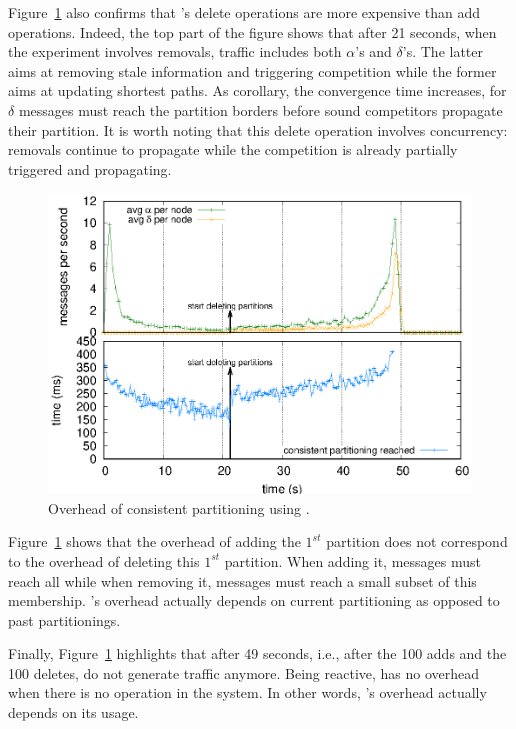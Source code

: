 \begin{asparadesc}
\noindent Figure~\ref{fig:complexity} also confirms that \NAME's
delete operations are more expensive than add operations. Indeed, the
top part of the figure shows that after 21 seconds, when the
experiment involves removals, traffic includes both $\alpha$'s and
$\delta$'s. The latter aims at removing stale information and
triggering competition while the former aims at updating shortest
paths. As corollary, the convergence time increases, for $\delta$
messages must reach the partition borders before sound competitors
propagate their partition. It is worth noting that this delete
operation involves concurrency: removals continue to propagate while
the competition is already partially triggered and propagating.

\begin{figure}
  \centering\includegraphics[width=0.8\columnwidth]{img/as_cast_complexity.eps}
  \caption{\label{fig:complexity}Overhead of consistent partitioning
    using \NAME.}
\end{figure}

\noindent Figure~\ref{fig:complexity} shows that the overhead of
adding the $1^{st}$ partition does not correspond to the overhead of
deleting this $1^{st}$ partition. When adding it, messages must reach
all \processes while when removing it, messages must reach a small
subset of this membership.  \NAME's overhead actually depends on
current partitioning as opposed to past partitionings.

\noindent Finally, Figure~\ref{fig:complexity} highlights that after
49 seconds, i.e., after the 100 adds and the 100 deletes, \processes
do not generate traffic anymore. Being reactive, \NAME has no overhead
when there is no operation in the system. In other words, \NAME's
overhead actually depends on its usage.

\end{asparadesc}

